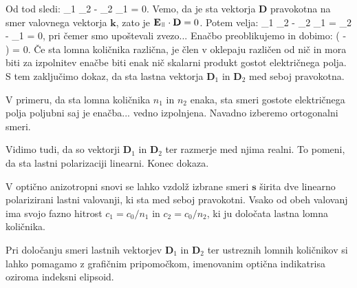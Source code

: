 Od tod sledi:
\beq
{}_1 \cdot {}_2 - _2 \cdot {}_1 = 0.
\eeq
Vemo, da je sta vektorja $\mathbf{D}$ pravokotna na smer valovnega vektorja $\mathbf{k}$,
zato je $\mathbf{E}_\myparallel \cdot \mathbf{D} = 0$. Potem velja:
\beq
{}_{1\perp} \cdot {}_2 - _{2\perp} \cdot {}_1 =
\cdot {}_2 - 
\cdot {}_1 = 0,
\eeq
pri čemer smo upoštevali zvezo... Enačbo preoblikujemo in dobimo:
\beq
{}\left(  - 
\right) = 0.
\eeq
Če sta lomna količnika različna, je člen v oklepaju različen od nič in mora 
biti za izpolnitev enačbe biti enak nič skalarni produkt gostot električnega
polja. S tem zaključimo dokaz, da sta lastna vektorja $\mathbf{D}_1$ in 
$\mathbf{D}_2$ med seboj pravokotna. 

V primeru, da sta lomna količnika $n_1$ in $n_2$ enaka, sta smeri gostote
električnega polja poljubni saj je enačba... vedno izpolnjena. Navadno 
izberemo ortogonalni smeri.

Vidimo tudi, da so vektorji $\mathbf{D}_1$ in $\mathbf{D}_2$ ter razmerje med njima
realni. To pomeni, da sta lastni polarizaciji linearni. 
Konec dokaza.

V optično anizotropni snovi se lahko vzdolž izbrane smeri $\mathbf{s}$ 
širita dve linearno polarizirani lastni valovanji, ki sta med seboj pravokotni. 
Vsako od obeh valovanj ima svojo fazno hitrost $c_1= c_0/n_1$ in $c_2 = c_0/n_2$,
ki ju določata lastna lomna količnika.

Pri določanju smeri lastnih vektorjev $\mathbf{D}_1$ in $\mathbf{D}_2$ 
ter ustreznih lomnih količnikov si lahko pomagamo z grafičnim pripomočkom, imenovanim
optična indikatrisa oziroma indeksni elipsoid. 

